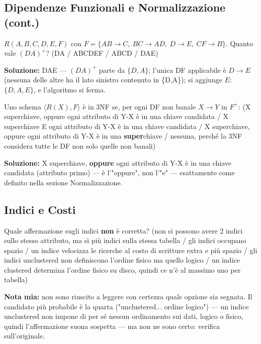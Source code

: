 \documentclass[12pt, a4paper]{article}
\begin{document}
\subsection{Dipendenze Funzionali e Normalizzazione (cont.)}

\begin{tcolorbox}[colback=lightergray!10, colframe=tocsec, title=\textbf{Esercizio 24}]
$R(A,B,C,D,E,F)$ con $F=\{AB\to C,\ BC\to AD,\ D\to E,\ CF\to B\}$. Quanto vale $(DA)^+$? (DA / ABCDEF / ABCD / DAE)
\end{tcolorbox}
\textbf{Soluzione:} DAE — $(DA)^+$ parte da $\{D,A\}$; l'unica DF applicabile è $D\to E$ (nessuna delle altre ha il lato sinistro contenuto in \{D,A\}); si aggiunge $E$: $\{D,A,E\}$, e l'algoritmo si ferma.

\begin{tcolorbox}[colback=lightergray!10, colframe=tocsec, title=\textbf{Esercizio 25}]
Uno schema $\langle R(X),F\rangle$ è in 3NF se, per ogni DF non banale $X\to Y$ in $F^+$: (X superchiave, oppure ogni attributo di Y-X è in una chiave candidata / X superchiave E ogni attributo di Y-X è in una chiave candidata / X superchiave, oppure ogni attributo di Y-X è in una \textbf{super}chiave / nessuna, perché la 3NF considera tutte le DF non solo quelle non banali)
\end{tcolorbox}
\textbf{Soluzione:} X superchiave, \textbf{oppure} ogni attributo di Y-X è in una chiave candidata (attributo primo) — è l'"oppure", non l'"e" — esattamente come definito nella sezione Normalizzazione.

\subsection{Indici e Costi}

\begin{tcolorbox}[colback=lightergray!10, colframe=tocsec, title=\textbf{Esercizio 26} (risposta da verificare sull'originale)]
Quale affermazione sugli indici \textbf{non} è corretta? (non si possono avere 2 indici sullo stesso attributo, ma sì più indici sulla stessa tabella / gli indici occupano spazio / un indice velocizza le ricerche al costo di scritture extra e più spazio / gli indici unclustered non definiscono l'ordine fisico ma quello logico / un indice clustered determina l'ordine fisico su disco, quindi ce n'è al massimo uno per tabella)
\end{tcolorbox}
\textbf{Nota mia:} non sono riuscito a leggere con certezza quale opzione sia segnata. Il candidato più probabile è la quarta ("unclustered... ordine logico") — un indice unclustered non impone di per sé nessun ordinamento sui dati, logico o fisico, quindi l'affermazione suona sospetta — ma non ne sono certo: verifica sull'originale.
\end{document}
